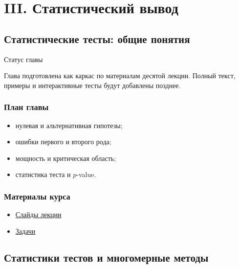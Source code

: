 \documentclass[
  russian,
  letterpaper,
]{scrbook}
\providecommand{\tightlist}{%
  \setlength{\itemsep}{0pt}\setlength{\parskip}{0pt}}
\begin{document}
\part{III. Статистический вывод}

\chapter{Статистические тесты: общие
понятия}\label{ux441ux442ux430ux442ux438ux441ux442ux438ux447ux435ux441ux43aux438ux435-ux442ux435ux441ux442ux44b-ux43eux431ux449ux438ux435-ux43fux43eux43dux44fux442ux438ux44f}

{Статус главы}

Глава подготовлена как каркас по материалам десятой лекции. Полный
текст, примеры и интерактивные тесты будут добавлены позднее.

\section{План
главы}\label{ux43fux43bux430ux43d-ux433ux43bux430ux432ux44b-8}

\begin{itemize}
\tightlist
\item
  нулевая и альтернативная гипотезы;
\item
  ошибки первого и второго рода;
\item
  мощность и критическая область;
\item
  статистика теста и \(p\)-value.
\end{itemize}

\section{Материалы
курса}\label{ux43cux430ux442ux435ux440ux438ux430ux43bux44b-ux43aux443ux440ux441ux430-7}

\begin{itemize}
\tightlist
\item
  \href{https://neutrinohit.github.io/statistical-analysis-course/ru/slides/09_statistical_tests_basics.html}{Слайды
  лекции}
\item
  \href{https://neutrinohit.github.io/statistical-analysis-course/ru/slides/exercises/09_statistical_tests_basics_exercises.html}{Задачи}
\end{itemize}

\chapter{Статистики тестов и многомерные
методы}\label{ux441ux442ux430ux442ux438ux441ux442ux438ux43aux438-ux442ux435ux441ux442ux43eux432-ux438-ux43cux43dux43eux433ux43eux43cux435ux440ux43dux44bux435-ux43cux435ux442ux43eux434ux44b}
\end{document}
